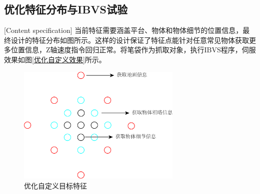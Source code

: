 \documentclass[fontset=fandol,type=bachelor,campus=harbin,bsmainpagenumberline=true]{hithesisbook}
\begin{document}
\subsection{优化特征分布与IBVS试验}[Content specification]
当前特征需要涵盖平台、物体和物体细节的位置信息，最终设计的特征分布如图\label{优化自定义目标特征}所示。这样的设计保证了特征点能针对任意常见物体获取更多位置信息，Z轴速度指令回归正常。将笔袋作为抓取对象，执行IBVS程序，伺服效果如图\ref{优化自定义效果}所示。
\begin{figure}[h]
	\centering
	\includegraphics[width=0.7\textwidth]{chapter4/优化自定义目标特征}
	\caption{优化自定义目标特征}
	\label{优化自定义目标特征}
\end{figure}
\end{document}
